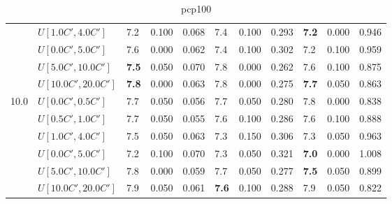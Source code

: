 \begin{table}[h]
{\begin{tabular}{|l|l||l|l|l||l|l|l||l|l|l|}
       & $U[1.0C',4.0C']$ & 7.2 & 0.100 & 0.068 & 7.4 & 0.100 & 0.293 & \textbf{7.2} & 0.000 & 0.946 \\
       & $U[0.0C',5.0C']$ & 7.6 & 0.000 & 0.062 & 7.4 & 0.100 & 0.302 & 7.2 & 0.100 & 0.959 \\
       & $U[5.0C',10.0C']$ & \textbf{7.5} & 0.050 & 0.070 & 7.8 & 0.000 & 0.262 & 7.6 & 0.100 & 0.875 \\
       & $U[10.0C',20.0C']$ & \textbf{7.8} & 0.000 & 0.063 & 7.8 & 0.000 & 0.275 & \textbf{7.7} & 0.050 & 0.863 \\
      \hline\hline
      \multirow{6}{*}{10.0} & $U[0.0C',0.5C']$ & 7.7 & 0.050 & 0.056 & 7.7 & 0.050 & 0.280 & 7.8 & 0.000 & 0.838 \\
       & $U[0.5C',1.0C']$ & 7.7 & 0.050 & 0.055 & 7.6 & 0.100 & 0.286 & 7.6 & 0.100 & 0.888 \\
       & $U[1.0C',4.0C']$ & 7.5 & 0.050 & 0.063 & 7.3 & 0.150 & 0.306 & 7.3 & 0.050 & 0.963 \\
       & $U[0.0C',5.0C']$ & 7.2 & 0.100 & 0.070 & 7.3 & 0.050 & 0.321 & \textbf{7.0} & 0.000 & 1.008 \\
       & $U[5.0C',10.0C']$ & 7.8 & 0.000 & 0.059 & 7.7 & 0.050 & 0.277 & \textbf{7.5} & 0.050 & 0.899 \\
       & $U[10.0C',20.0C']$ & 7.9 & 0.050 & 0.061 & \textbf{7.6} & 0.100 & 0.288 & 7.9 & 0.050 & 0.822 \\
      \hline
      \end{tabular}
      }
      \caption{pcp100}
      \label{tab:pcpn100RecoloredTT}\end{table}


